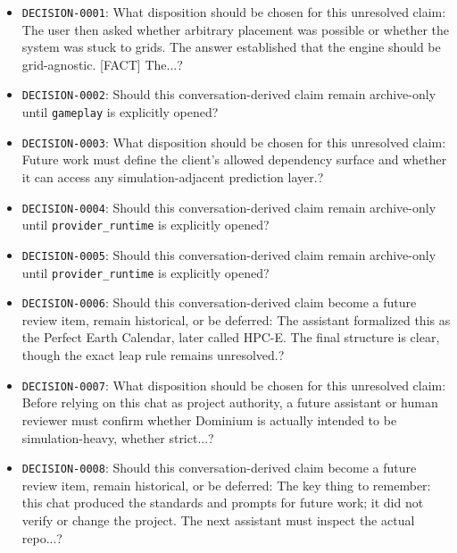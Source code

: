 \documentclass[9pt,a4paper,openany]{book}
\begin{document}
\begin{itemize}
\item \texttt{DECISION-\allowbreak{}0001}: What disposition should be chosen for this unresolved claim: The user then asked whether arbitrary placement was possible or whether the system was stuck to grids.\allowbreak{} The answer established that the engine should be grid-\allowbreak{}agnostic.\allowbreak{} [FACT] The.\allowbreak{}.\allowbreak{}.\allowbreak{}?
\item \texttt{DECISION-\allowbreak{}0002}: Should this conversation-\allowbreak{}derived claim remain archive-\allowbreak{}only until \texttt{gameplay} is explicitly opened?
\item \texttt{DECISION-\allowbreak{}0003}: What disposition should be chosen for this unresolved claim: Future work must define the client's allowed dependency surface and whether it can access any simulation-\allowbreak{}adjacent prediction layer.\allowbreak{}?
\item \texttt{DECISION-\allowbreak{}0004}: Should this conversation-\allowbreak{}derived claim remain archive-\allowbreak{}only until \texttt{provider\_\allowbreak{}runtime} is explicitly opened?
\item \texttt{DECISION-\allowbreak{}0005}: Should this conversation-\allowbreak{}derived claim remain archive-\allowbreak{}only until \texttt{provider\_\allowbreak{}runtime} is explicitly opened?
\item \texttt{DECISION-\allowbreak{}0006}: Should this conversation-\allowbreak{}derived claim become a future review item, remain historical, or be deferred: The assistant formalized this as the Perfect Earth Calendar, later called HPC-\allowbreak{}E.\allowbreak{} The final structure is clear, though the exact leap rule remains unresolved.\allowbreak{}?
\item \texttt{DECISION-\allowbreak{}0007}: What disposition should be chosen for this unresolved claim: Before relying on this chat as project authority, a future assistant or human reviewer must confirm whether Dominium is actually intended to be simulation-\allowbreak{}heavy, whether strict.\allowbreak{}.\allowbreak{}.\allowbreak{}?
\item \texttt{DECISION-\allowbreak{}0008}: Should this conversation-\allowbreak{}derived claim become a future review item, remain historical, or be deferred: The key thing to remember: this chat produced the standards and prompts for future work; it did not verify or change the project.\allowbreak{} The next assistant must inspect the actual repo.\allowbreak{}.\allowbreak{}.\allowbreak{}?

\end{itemize}
\end{document}
